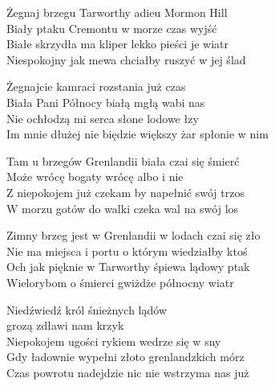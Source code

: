 \begin{textn}

    Żegnaj brzegu Tarworthy adieu Mormon Hill\\
    Biały ptaku Cremontu w morze czas wyjść\\
    Białe skrzydła ma kliper lekko pieści je wiatr\\
    Niespokojny jak mewa chciałby ruszyć w jej ślad

    Żegnajcie kamraci rozstania już czas\\
    Biała Pani Północy białą mgłą wabi nas\\
    Nie ochłodzą mi serca słone lodowe łzy\\
    Im mnie dłużej nie biędzie większy żar spłonie w nim

    Tam u brzegów Grenlandii biała czai się śmierć\\
    Może wrócę bogaty wrócę albo i nie\\
    Z niepokojem już czekam by napełnić swój trzos\\
    W morzu gotów do walki czeka wal na swój los

    Zimny brzeg jest w Grenlandii w lodach czai się zło\\
    Nie ma miejsca i portu o którym wiedziałby ktoś\\
    Och jak pięknie w Tarworthy śpiewa lądowy ptak\\
    Wielorybom o śmierci gwiżdże północny wiatr

    Niedźwiedź król śnieżnych lądów\\
    \vin \vin \vin \vin \vin grozą zdławi nam krzyk\\
    Niepokojem ugości rykiem wedrze się w sny\\
    Gdy ładownie wypełni złoto grenlandzkich mórz\\
    Czas powrotu nadejdzie nic nie wstrzyma nas już

\end{textn}
